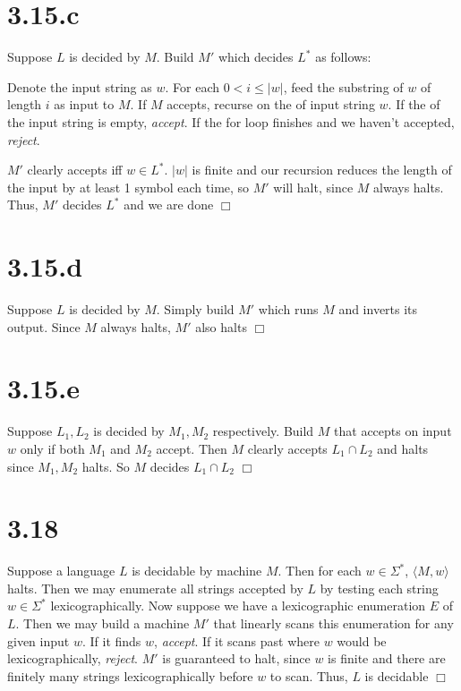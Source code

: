 \documentclass{article}
\newenvironment{myindentpar}[1]
  {\begin{list}{}
          {\setlength{\leftmargin}{#1}\setlength{\rightmargin}{#1}}
          \item[]
  }
  {\end{list}}
\begin{document}
\section*{3.15.c}
Suppose $L$ is decided by $M$. Build $M'$ which decides $L^*$ as follows:
\begin{myindentpar}{1em}
  Denote the input string as $w$. For each $0 < i \leqslant |w|$, feed the substring of $w$ of length $i$ as input to $M$. If $M$ accepts, recurse on the  of input string $w$. If the  of the input string is empty, \textit{accept}. If the for loop finishes and we haven't accepted, \textit{reject}.
\end{myindentpar}
$M'$ clearly accepts iff $w \in L^*$. $|w|$ is finite and our recursion reduces the length of the input by at least 1 symbol each time, so $M'$ will halt, since $M$ always halts. Thus, $M'$ decides $L^*$ and we are done $\Box$

\section*{3.15.d}
Suppose $L$ is decided by $M$. Simply build $M'$ which runs $M$ and inverts its output. Since $M$ always halts, $M'$ also halts $\Box$

\section*{3.15.e}
Suppose $L_1, L_2$ is decided by $M_1,M_2$ respectively. Build $M$ that accepts on input $w$ only if both $M_1$ and $M_2$ accept. Then $M$ clearly accepts $L_1 \cap L_2$ and halts since $M_1, M_2$ halts. So $M$ decides $L_1 \cap L_2$ $\Box$

\section*{3.18}
Suppose a language $L$ is decidable by machine $M$. Then for each $w \in \Sigma^*$, $\langle M,w \rangle$ halts. Then we may enumerate all strings accepted by $L$ by testing each string $w \in \Sigma^*$ lexicographically. Now suppose we have a lexicographic enumeration $E$ of $L$. Then we may build a machine $M'$ that linearly scans this enumeration for any given input $w$. If it finds $w$, \textit{accept}. If it scans past where $w$ would be lexicographically, \textit{reject}. $M'$ is guaranteed to halt, since $w$ is finite and there are finitely many strings lexicographically before $w$ to scan. Thus, $L$ is decidable $\Box$
\end{document}

